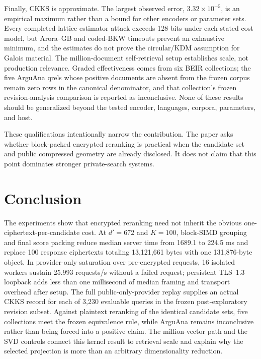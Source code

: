 \documentclass[pdflatex,sn-basic,Numbered]{sn-jnl}
\theoremstyle{plain}
\begin{document}
Finally, CKKS is approximate. The largest observed error, $3.32\times10^{-5}$, is an empirical maximum rather than a bound for other encoders or parameter sets. Every completed lattice-estimator attack exceeds 128 bits under each stated cost model, but Arora--GB and coded-BKW timeouts prevent an exhaustive minimum, and the estimates do not prove the circular/KDM assumption for Galois material. The million-document self-retrieval setup establishes scale, not production relevance. Graded effectiveness comes from six BEIR collections; the five ArguAna qrels whose positive documents are absent from the frozen corpus remain zero rows in the canonical denominator, and that collection's frozen revision-analysis comparison is reported as inconclusive. None of these results should be generalized beyond the tested encoder, languages, corpora, parameters, and host.

These qualifications intentionally narrow the contribution. The paper asks whether block-packed encrypted reranking is practical when the candidate set and public compressed geometry are already disclosed. It does not claim that this point dominates stronger private-search systems.

\section{Conclusion}\label{sec:conclusion}

The experiments show that encrypted reranking need not inherit the obvious one-ciphertext-per-candidate cost. At $d'=672$ and $K=100$, block-SIMD grouping and final score packing reduce median server time from 1689.1 to 224.5 ms and replace 100 response ciphertexts totaling 13,121,661 bytes with one 131,876-byte object. In provider-only saturation over pre-encrypted requests, 16 isolated workers sustain 25.993 requests/s without a failed request; persistent TLS~1.3 loopback adds less than one millisecond of median framing and transport overhead after setup. The full public-only-provider replay supplies an actual CKKS record for each of 3,230 evaluable queries in the frozen post-exploratory revision subset. Against plaintext reranking of the identical candidate sets, five collections meet the frozen equivalence rule, while ArguAna remains inconclusive rather than being forced into a positive claim. The million-vector path and the SVD controls connect this kernel result to retrieval scale and explain why the selected projection is more than an arbitrary dimensionality reduction.
\end{document}
